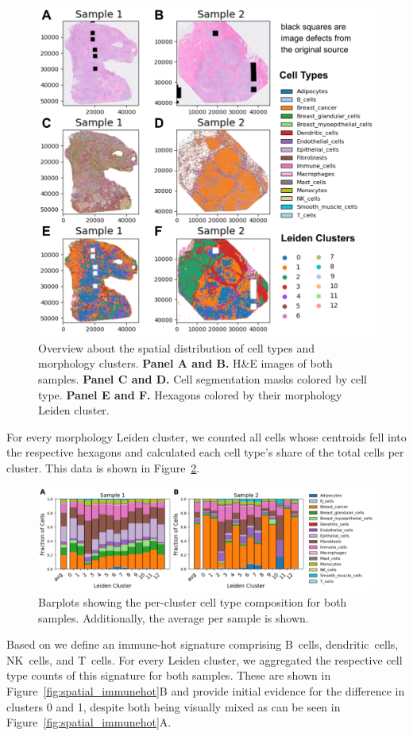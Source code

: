 \documentclass{article}
\begin{document}
\begin{figure}[htbp]
\centering
\includegraphics[width=.65\linewidth]{./figs/fig_S2_spatial_hne.png}
\caption{\label{fig:spatial_hne}{}Overview about the spatial distribution of cell types and morphology clusters. \textbf{Panel A and B.} H\&E images of both samples. \textbf{Panel C and D.} Cell segmentation masks colored by cell type. \textbf{Panel E and F.} Hexagons colored by their morphology Leiden cluster.}
\end{figure}

For every morphology Leiden cluster, we counted all cells whose centroids fell into the respective hexagons and calculated each cell type's share of the total cells per cluster. This data is shown in Figure~\ref{fig:spatial_composition}.

\begin{figure}[htbp!]
\centering
\includegraphics[width=.95\linewidth]{./figs/fig_S3_spatial_composition.png}
\caption{\label{fig:spatial_composition}{}Barplots showing the per-cluster cell type composition for both samples. Additionally, the average per sample is shown.}
\end{figure}

\newpage

Based on \citep{Wu2024-zp} we define an immune-hot signature comprising B~cells, dendritic~cells, NK~cells, and T~cells. For every Leiden cluster, we aggregated the respective cell type counts of this signature for both samples. These are shown in Figure~\ref{fig:spatial_immunehot}B and provide initial evidence for the difference in clusters 0 and 1, despite both being visually mixed as can be seen in Figure~\ref{fig:spatial_immunehot}A.
\end{document}
